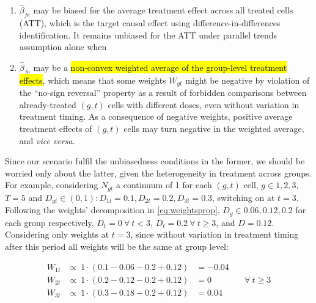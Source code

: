 \documentclass[11pt]{article}
\begin{document}
\begin{enumerate}
    \item $\hat{\beta}_{fe}$ may be biased for the average treatment effect across all treated cells (ATT), which is the target causal effect using difference-in-differences identification. It remains unbiased for the ATT under parallel trends assumption alone when
    \item $\hat{\beta}_{fe}$ may be a \hl{non-convex weighted average of the group-level treatment effects}, which means that some weights $W_{gt}$ might be negative by violation of the ``no-sign reversal'' property as a result of forbidden comparisons between already-treated $(g,t)$ cells with different doses, even without variation in treatment timing. As a consequence of negative weights, positive average treatment effects of $(g,t)$ cells may turn negative in the weighted average, and \textit{vice versa}.
\end{enumerate}

Since our scenario fulfil the unbiasedness conditions in the former, we should be worried only about the latter, given the heterogeneity in treatment across groups. For example, considering $N_{gt}$ a continuum of 1 for each $(g,t)$ cell, $g \in {1, 2, 3}$, $T = 5$ and $D_{gt} \in (0, 1) : D_{1t} = 0.1, D_{2t} = 0.2, D_{3t} = 0.3$, switching on at $t = 3$. Following the weights' decomposition in \eqref{eq:weightsprop}, $D_{g} \in {0.06, 0.12, 0.2}$ for each group respectively, $D_{t} = 0 \ \forall \ t < 3$, $D_{t} = 0.2 \ \forall \ t \geq 3$, and $D = 0.12$. Considering only weights at $t = 3$, since without variation in treatment timing after this period all weights will be the same at group level:

\begin{equation*}
    \begin{array}{lllr}
        W_{1t} &\propto \ 1 \cdot (0.1 - 0.06 - 0.2 + 0.12) &= -0.04& \\
        W_{2t} &\propto \ 1 \cdot (0.2 - 0.12 - 0.2 + 0.12) &= 0& \quad \forall \ t \geq 3\\
        W_{3t} &\propto \ 1 \cdot (0.3 - 0.18 - 0.2 + 0.12) &= 0.04&
    \end{array}
\end{equation*}
\end{document}

